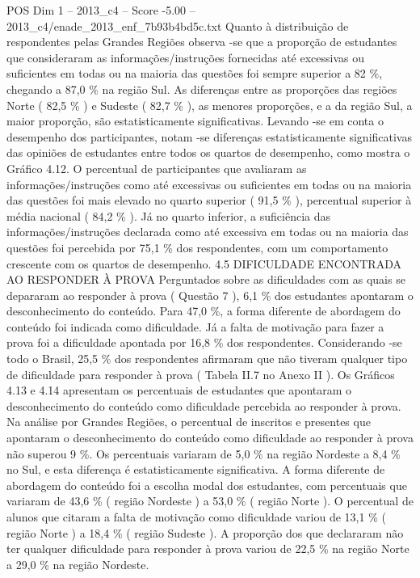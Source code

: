 \begin{textsample}{POS Dim 1 – 2013\_c4 – Score -5.00 – 2013\_c4/enade\_2013\_enf\_7b93b4bd5c.txt}
Quanto à distribuição de respondentes pelas Grandes Regiões observa -se que a proporção de estudantes que consideraram as informações/instruções fornecidas até excessivas ou suficientes em todas ou na maioria das questões foi sempre superior a 82 \%, chegando a 87,0 \% na região Sul.
As diferenças entre as proporções das regiões Norte ( 82,5 \% ) e Sudeste ( 82,7 \% ), as menores proporções, e a da região Sul, a maior proporção, são estatisticamente significativas.
Levando -se em conta o desempenho dos participantes, notam -se diferenças estatisticamente significativas das opiniões de estudantes entre todos os quartos de desempenho, como mostra o Gráfico 4.12.
O percentual de participantes que avaliaram as informações/instruções como até excessivas ou suficientes em todas ou na maioria das questões foi mais elevado no quarto superior ( 91,5 \% ), percentual superior à média nacional ( 84,2 \% ).
Já no quarto inferior, a suficiência das informações/instruções declarada como até excessiva em todas ou na maioria das questões foi percebida por 75,1 \% dos respondentes, com um comportamento crescente com os quartos de desempenho. 4.5 DIFICULDADE ENCONTRADA AO RESPONDER À PROVA Perguntados sobre as dificuldades com as quais se depararam ao responder à prova ( Questão 7 ), 6,1 \% dos estudantes apontaram o desconhecimento do conteúdo.
Para 47,0 \%, a forma diferente de abordagem do conteúdo foi indicada como dificuldade.
Já a falta de motivação para fazer a prova foi a dificuldade apontada por 16,8 \% dos respondentes.
Considerando -se todo o Brasil, 25,5 \% dos respondentes afirmaram que não tiveram qualquer tipo de dificuldade para responder à prova ( Tabela II.7 no Anexo II ).
Os Gráficos 4.13 e 4.14 apresentam os percentuais de estudantes que apontaram o desconhecimento do conteúdo como dificuldade percebida ao responder à prova.
Na análise por Grandes Regiões, o percentual de inscritos e presentes que apontaram o desconhecimento do conteúdo como dificuldade ao responder à prova não superou 9 \%.
Os percentuais variaram de 5,0 \% na região Nordeste a 8,4 \% no Sul, e esta diferença é estatisticamente significativa.
A forma diferente de abordagem do conteúdo foi a escolha modal dos estudantes, com percentuais que variaram de 43,6 \% ( região Nordeste ) a 53,0 \% ( região Norte ).
O percentual de alunos que citaram a falta de motivação como dificuldade variou de 13,1 \% ( região Norte ) a 18,4 \% ( região Sudeste ).
A proporção dos que declararam não ter qualquer dificuldade para responder à prova variou de 22,5 \% na região Norte a 29,0 \% na região Nordeste.

\end{textsample}
